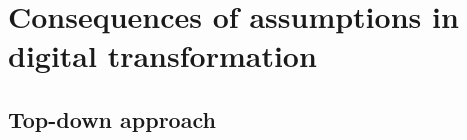 \documentclass[a4]{scrartcl}
\begin{document}














\section{Consequences of assumptions in digital transformation} \label{sec:Sec2}












\subsection{Top-down approach} \label{subsec:topdown_consequences}
\end{document}
